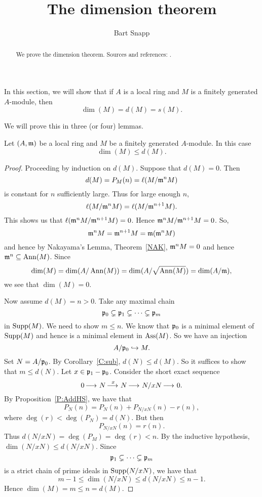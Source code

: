 \documentclass{ximera}
\author{Bart Snapp}
\title{The dimension theorem}
\begin{document}
\begin{abstract}
  We prove the dimension theorem. Sources and
  references: \cite{sD2008,hM1986}.
\end{abstract}
\maketitle


In this section, we will show that if $A$ is a local ring and $M$ is a
finitely generated $A$-module, then
\[
\dim(M) = d(M) = s(M). 
\]

We will prove this in three (or four) lemmas.

\begin{lemma}\label{L:dimd}
  Let $(A,\mathfrak{m})$ be a local ring and $M$ be a finitely generated
  $A$-module. In this case
  \[
  \dim(M)\le d(M).
  \]
  \begin{proof}
    Proceeding by induction on $d(M)$. Suppose that $d(M) = 0$. Then 
    \[
    d(M) = P_M(n) = \ell(M/\mathfrak{m}^n M)
    \]
    is constant for $n$ sufficiently large. Thus for large enough $n$,
    \[
    \ell(M/\mathfrak{m}^n M) = \ell(M/\mathfrak{m}^{n+1}M).
    \]
    This shows us that $\ell(\mathfrak{m}^n M/\mathfrak{m}^{n+1}M) = 0$. Hence $\mathfrak{m}^n
    M/\mathfrak{m}^{n+1}M = 0$. So,
    \[
    \mathfrak{m}^n M = \mathfrak{m}^{n+1}M = \mathfrak{m}(\mathfrak{m}^n M)
    \]
    and hence by Nakayama's Lemma,
    Theorem~\ref{NAK}, $\mathfrak{m}^n M =0$ and hence
    $\mathfrak{m}^n\subseteq\operatorname{Ann}(M)$. Since
    \[
    \dim(M) = \dim(A/\operatorname{Ann}(M))  = \dim(A/\sqrt{\operatorname{Ann}(M)}) = \dim(A/\mathfrak{m}),
    \]   
    we see that $\dim(M) = 0$. 
    
    Now assume $d(M) = n> 0$. Take any maximal chain 
    \[
    \mathfrak{p}_0\subsetneq \mathfrak{p}_1 \subsetneq \cdots \subsetneq \mathfrak{p}_m
    \]
    in $\operatorname{Supp}(M)$.  We need to show $m\le n$. We know that $\mathfrak{p}_0$ is a
    minimal element of $\operatorname{Supp}(M)$ and hence is a minimal element in
    $\operatorname{Ass}(M)$.  So we have an injection
    \[
    A/\mathfrak{p}_0\hookrightarrow M.
    \]
    Set $N = A/\mathfrak{p}_0$.  By Corollary~\ref{C:sub}, $d(N) \le d(M)$.  So
    it suffices to show that $m \le d(N)$.  Let $x \in \mathfrak{p}_1 - \mathfrak{p}_0$.
    Consider the short exact sequence
    \[
    0\mathop{\longrightarrow\,}\limits N \mathop{\longrightarrow\,}\limits^{x} N \mathop{\longrightarrow\,}\limits N/xN \mathop{\longrightarrow\,}\limits 0.
    \]
    By Proposition~\ref{P:AddHS}, we have that
    \[
    P_N(n) = P_N(n) + P_{N/xN}(n) - r(n),
    \]
    where $\deg(r) < \deg(P_N) = d(N)$.  But then
    \[
    P_{N/xN}(n) = r(n).
    \]
    Thus $d(N/xN) = \deg(P_M) = \deg(r) < n$.  By the
    inductive hypothesis, $\dim(N/xN) \le d(N/xN)$.  Since
    \[
    \mathfrak{p}_1 \subsetneq \cdots \subsetneq \mathfrak{p}_m
    \]
    is a strict chain of prime ideals in $\operatorname{Supp}(N/xN)$, we have that
    \[
    m - 1 \le \dim(N/xN) \le d(N/xN) \le n - 1.
    \]
    Hence $\dim(M) = m \le n = d(M)$.
  \end{proof}
\end{lemma}
\end{document}
